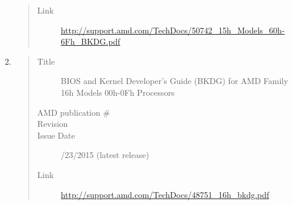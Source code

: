\documentclass[a4paper,8pt,english]{sphinxmanual}
\begin{document}
\begin{enumerate}
\begin{quote}
\begin{description}
\item[{Link}] \leavevmode
\href{http://support.amd.com/TechDocs/50742\_15h\_Models\_60h-6Fh\_BKDG.pdf}{http://support.amd.com/TechDocs/50742\_15h\_Models\_60h-6Fh\_BKDG.pdf}

\end{description}\end{quote}

\item {} \begin{quote}\begin{description}
\item[{Title}] \leavevmode
BIOS and Kernel Developer's Guide (BKDG) for AMD Family 16h
Models 00h-0Fh Processors

\item[{AMD publication \#}] 

\item[{Revision}] 

\item[{Issue Date}] /23/2015 (latest release)

\item[{Link}] \leavevmode
\href{http://support.amd.com/TechDocs/48751\_16h\_bkdg.pdf}{http://support.amd.com/TechDocs/48751\_16h\_bkdg.pdf}

\end{description}\end{quote}

\end{enumerate}
\end{document}
